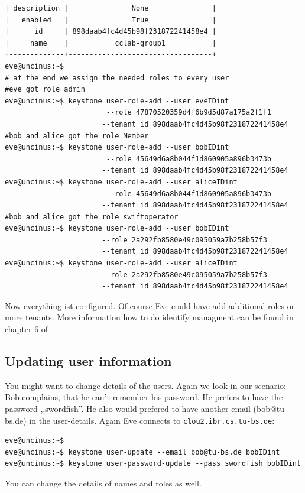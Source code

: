 \documentclass[a4paper,ngerman,bibtotocliststotoc]{scrartcl}
\begin{document}
\begin{verbatim}
| description |               None               |
|   enabled   |               True               |
|      id     | 898daab4fc4d45b98f231872241458e4 |
|     name    |           cclab-group1           |
+-------------+----------------------------------+
eve@uncinus:~$ 
# at the end we assign the needed roles to every user
#eve got role admin
eve@uncinus:~$ keystone user-role-add --user eveIDint  
                        --role 47870520359d4f6b9d5d87a175a2f1f1 
                       --tenant_id 898daab4fc4d45b98f231872241458e4
#bob and alice got the role Member
eve@uncinus:~$ keystone user-role-add --user bobIDint 
                        --role 45649d6a8b044f1d860905a896b3473b 
                       --tenant_id 898daab4fc4d45b98f231872241458e4
eve@uncinus:~$ keystone user-role-add --user aliceIDint 
                        --role 45649d6a8b044f1d860905a896b3473b 
                       --tenant_id 898daab4fc4d45b98f231872241458e4
#bob and alice got the role swiftoperator
eve@uncinus:~$ keystone user-role-add --user bobIDint    
                       --role 2a292fb8580e49c095059a7b258b57f3 
                       --tenant_id 898daab4fc4d45b98f231872241458e4
eve@uncinus:~$ keystone user-role-add --user aliceIDint  
                       --role 2a292fb8580e49c095059a7b258b57f3 
                       --tenant_id 898daab4fc4d45b98f231872241458e4
\end{verbatim}
Now everything ist configured. Of course Eve could have add additional
roles or more tenants. More information how to do identify managment
can be found in chapter 6 of \cite{computeadmin}%

\subsection{Updating user information}
\label{sec:updat-user-inform}
You might want to change details of the users. Again we look in our
scenario:
Bob complains, that he can't remember his password. He prefers to have
the password ,,swordfish''. He also would prefered to have another email
(bob@tu-bs.de) in the user-details.
Again Eve connects to \verb|clou2.ibr.cs.tu-bs.de|:
\begin{verbatim}
eve@uncinus:~$
eve@uncinus:~$ keystone user-update --email bob@tu-bs.de bobIDint
eve@uncinus:~$ keystone user-password-update --pass swordfish bobIDint
\end{verbatim}
You can change the details of names and roles as well. 
\end{document}

